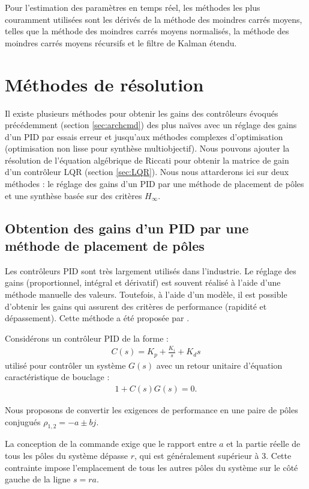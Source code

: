 Pour l'estimation des paramètres en temps réel, les méthodes les plus couramment utilisées sont les dérivés de la méthode des moindres carrés moyens, telles que la méthode des moindres carrés moyens normalisés, la méthode des moindres carrés moyens récursifs et le filtre de Kalman étendu. 

\section{Méthodes de résolution}
\label{sec:methodo}
    Il existe plusieurs méthodes pour obtenir les gains des contrôleurs évoqués précédemment (section \ref{sec:archcmd}) des plus naïves avec un réglage des gains d'un PID par essais erreur et jusqu'aux méthodes complexes d'optimisation (optimisation non lisse pour synthèse multiobjectif). Nous pouvons ajouter la résolution de l'équation algébrique de Riccati pour obtenir la matrice de gain d'un contrôleur LQR (section \ref{sec:LQR}). Nous nous attarderons ici sur deux méthodes : le réglage des gains d'un PID par une méthode de placement de pôles et une synthèse basée sur des critères $H_{\infty}$.


\subsection*{Obtention des gains d'un PID par une méthode de placement de pôles \cite{WANG2008PID}}
Les contrôleurs PID sont très largement utilisés dans l'industrie. Le réglage des gains (proportionnel, intégral et dérivatif) est souvent réalisé à l'aide d'une méthode manuelle des valeurs. Toutefois, à l'aide d'un modèle, il est possible d'obtenir les gains qui assurent des critères de performance (rapidité et dépassement). Cette méthode a été proposée par \cite{WANG2008PID}.

Considérons un contrôleur PID de la forme :
\begin{align}
    C(s) = K_{p} +  \frac{K_{i}}{s} + K_{d} s
\end{align}
utilisé pour contrôler un système $G(s)$ avec un retour unitaire d'équation caractéristique de bouclage :
\begin{align}
    \label{eq:bouclePID}
    1+ C(s)G(s) = 0.
\end{align}

Nous proposons de convertir les exigences de performance en une paire de pôles conjugués $\rho_{1,2} = -a \pm bj$.

La conception de la commande exige que le rapport entre $a$ et la partie réelle de tous les pôles du système dépasse $r$, qui est généralement supérieur à 3. Cette contrainte impose l'emplacement de tous les autres pôles du système sur le côté gauche de la ligne $s = ra$.

